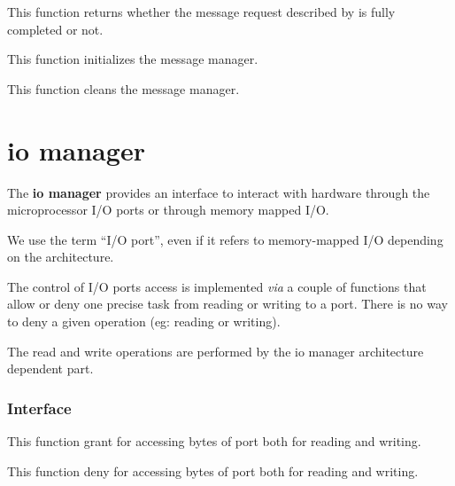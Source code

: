 	 {
	   This function returns whether the message request described
	   by  is fully completed or not.
	 }

	 {
	   This function initializes the message manager.
	 }

	 {
	   This function cleans the message manager.
	 }

%
%

\section{io manager}

The \textbf{io manager} provides an interface to interact with
hardware through the microprocessor I/O ports or through memory mapped
I/O.

We use the term ``I/O port'', even if it refers to memory-mapped I/O
depending on the architecture.

The control of I/O ports access is implemented \textit{via} a couple
of functions that allow or deny one precise task from reading or
writing to a port. There is no way to deny a given operation (eg:
reading or writing).

The read and write operations are performed by the io manager
architecture dependent part.

%
%

\subsubsection{Interface}

	 {
	   This function grant  for accessing
	    bytes of  port both for
	   reading and writing.
	 }

	 {
	   This function deny  for accessing
	    bytes of  port both for
	   reading and writing.
	 }

